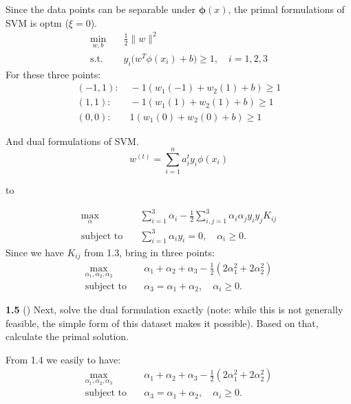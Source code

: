 
Since the data points can be separable under $\mathbf{\phi}(x)$, the primal formulations of SVM is optm ($\xi =0$).
\[
\begin{aligned}
\min_{w,b} \quad & \frac{1}{2}\|w\|^2 \\
\text{s.t.} \quad 
& y_i \big(w^T \phi(x_i) + b\big) \ge 1, 
\quad i = 1,2,3
\end{aligned}
\]
For these three points:
\begin{align*}
(-1,1) :  &\; -1(w_1(-1)+w_2(1)+b) \ge 1 \\
(1,1) :  &\;  -1(w_1(1)+w_2(1)+b) \ge 1 \\
(0,0) :  &\;  1(w_1(0)+w_2(0)+b) \ge 1
\end{align*}

And dual formulations of SVM.
\[
w^{(t)} = \sum_{i=1}^{n} a_i^{t} y_i \phi(x_i)
\]
\begin{center}
to
\end{center}
\[
\begin{aligned}
\max_{\alpha} \quad 
& \sum_{i=1}^{3} \alpha_i
- \frac{1}{2}
\sum_{i,j=1}^{3}
\alpha_i \alpha_j y_i y_j K_{ij} \\
\text{subject to} \quad
& \sum_{i=1}^{3} \alpha_i y_i = 0,
\quad \alpha_i \ge 0.
\end{aligned}
\]
Since we have $K_{ij}$ from 1.3, bring in three points:
\[
\begin{aligned}
\max_{\alpha_1,\alpha_2,\alpha_3}
\quad
&\alpha_1 + \alpha_2 + \alpha_3
-
\frac{1}{2}
\left( 2\alpha_1^2 + 2\alpha_2^2 \right) \\
\text{subject to} \quad
& \alpha_3 = \alpha_1 + \alpha_2,
\quad \alpha_i \ge 0.
\end{aligned}
\]


\bigskip

\textbf{1.5} () Next, solve the dual formulation exactly (note: while this is not generally feasible, the simple form of this dataset makes it possible).
Based on that, calculate the primal solution.\\


From 1.4 we easily to have:
\[
\begin{aligned}
\max_{\alpha_1,\alpha_2,\alpha_3}
\quad
&\alpha_1 + \alpha_2 + \alpha_3
-
\frac{1}{2}
\left( 2\alpha_1^2 + 2\alpha_2^2 \right) \\
\text{subject to} \quad
& \alpha_3 = \alpha_1 + \alpha_2,
\quad \alpha_i \ge 0.
\end{aligned}
\]

